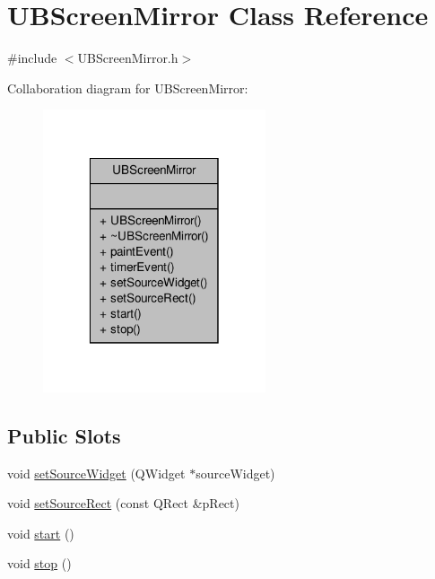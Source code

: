 \hypertarget{class_u_b_screen_mirror}{\section{U\-B\-Screen\-Mirror Class Reference}
\label{da/de7/class_u_b_screen_mirror}
}


{\ttfamily \#include $<$U\-B\-Screen\-Mirror.\-h$>$}



Collaboration diagram for U\-B\-Screen\-Mirror\-:
\nopagebreak
\begin{figure}[H]
\begin{center}
\leavevmode
\includegraphics[width=186pt]{d3/d4c/class_u_b_screen_mirror__coll__graph}
\end{center}
\end{figure}
\subsection*{Public Slots}
\begin{DoxyCompactItemize}
\item 
void \hyperlink{class_u_b_screen_mirror_a4885aebc1ac800284227b8edbc98f213}{set\-Source\-Widget} (Q\-Widget $\ast$source\-Widget)
\item 
void \hyperlink{class_u_b_screen_mirror_a16cae16aeaafb227510dc8fa67b0f4a2}{set\-Source\-Rect} (const Q\-Rect \&p\-Rect)
\item 
void \hyperlink{class_u_b_screen_mirror_a4d43e8f04c1e514b3f42d5a06c8391e1}{start} ()
\item 
void \hyperlink{class_u_b_screen_mirror_a86fde636fadf9a639177c0e8ff76b915}{stop} ()
\end{DoxyCompactItemize}
